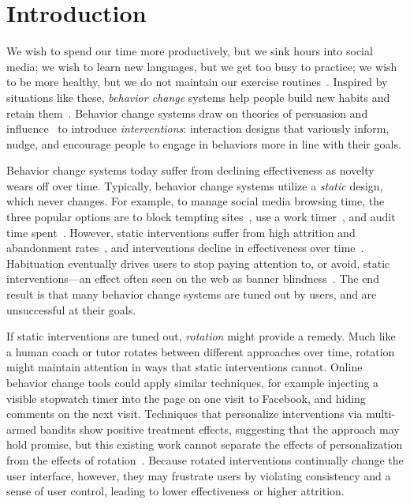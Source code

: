 \section{Introduction}

We wish to spend our time more productively, but we sink hours into social media; we wish to learn new languages, but we get too busy to practice; we wish to be more healthy, but we do not maintain our exercise routines~\cite{consolvo2009theory}. Inspired by situations like these, \textit{behavior change} systems help people build new habits and retain them~\cite{consolvo2008activity,froehlich2009ubigreen,kay2012lullaby,kim2016timeaware}. Behavior change systems draw on theories of persuasion and influence~\cite{fogg2002persuasive,cialdini1987influence} to introduce \textit{interventions}: interaction designs that variously inform, nudge, and encourage people to engage in behaviors more in line with their goals.

Behavior change systems today suffer from declining effectiveness as novelty wears off over time. Typically, behavior change systems utilize a \textit{static} design, which never changes. For example, to manage social media browsing time, the three popular options are to block tempting sites~\cite{stayfocusd}, use a work timer~\cite{focusbooster}, and audit time spent~\cite{khovanskaya2013everybody,rescuetimeapp}. However, static interventions suffer from high attrition and abandonment rates~\cite{collins2014social,eysenbach2005law}, and interventions decline in effectiveness over time~\cite{krebs2010meta}. Habituation eventually drives users to stop paying attention to, or avoid, static interventions---an effect often seen on the web as banner blindness~\cite{benway1998banner}. The end result is that many behavior change systems are tuned out by users, and are unsuccessful at their goals.

If static interventions are tuned out, \textit{rotation} might provide a remedy. Much like a human coach or tutor rotates between different approaches over time, rotation might maintain attention in ways that static interventions cannot. Online behavior change tools could apply similar techniques, for example injecting a visible stopwatch timer into the page on one visit to Facebook, and hiding comments on the next visit.
Techniques that personalize interventions via multi-armed bandits show positive treatment effects, suggesting that the approach may hold promise, but this existing work cannot separate the effects of personalization from the effects of rotation~\cite{rabbi2015automated, lei2017actor, paredes2014poptherapy}. %
Because rotated interventions continually change the user interface, however, they may frustrate users by violating consistency and a sense of user control, leading to lower effectiveness or higher attrition. %

